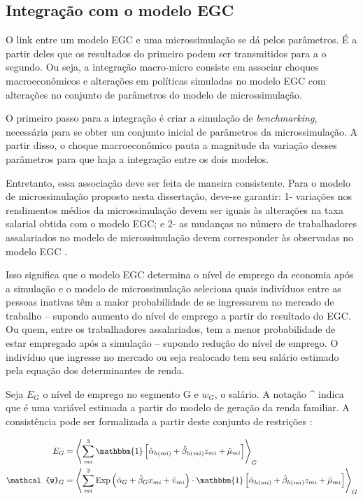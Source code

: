 \subsection{Integração com o modelo EGC}\label{subsec:integracao}

O link entre um modelo EGC e uma microssimulação se dá pelos parâmetros. É a partir deles que os resultados do primeiro podem ser transmitidos para a o segundo. Ou seja, a integração macro-micro consiste em associar choques macroeconômicos e alterações em políticas simuladas no modelo EGC com alterações no conjunto de parâmetros do modelo de microssimulação.

O primeiro passo para a integração é criar a simulação de \textit{benchmarking}, necessária para se obter um conjunto inicial de parâmetros da microssimulação. A partir disso, o choque macroeconômico pauta a magnitude da variação desses parâmetros para que haja a integração entre os dois modelos.

Entretanto, essa associação deve ser feita de maneira consistente. Para o modelo de microssimulação proposto nesta dissertação, deve-se garantir: 1- variações nos rendimentos médios da microssimulação devem ser iguais às alterações na taxa salarial obtida com o modelo EGC; e 2- as mudanças no número de trabalhadores assalariados no modelo de microssimulação devem corresponder às observadas no modelo EGC \cite{bourguignon05, colombo08}.

Isso significa que o modelo EGC determina o nível de emprego da economia após a simulação e o modelo de microssimulação seleciona quais indivíduos entre as pessoas inativas têm a maior probabilidade de se ingressarem no mercado de trabalho -- supondo aumento do nível de emprego a partir do resultado do EGC. Ou quem, entre os trabalhadores assalariados, tem a menor probabilidade de estar empregado após a simulação -- supondo redução do nível de emprego. O indivíduo que ingresse no mercado ou seja realocado tem seu salário estimado pela equação dos determinantes de renda. 

Seja $E_G$ o nível de emprego no segmento G e $w_G$, o salário. A notação \^{} indica que é uma variável estimada a partir do modelo de geração da renda familiar. A consistência pode ser formalizada a partir deste conjunto de restrições \cite{bourguignon05}:

\begin{align}
	E_G &= \left\langle \sum_{mi}^{3} \mathbbm{1} \left[ \hat{\alpha}_{h(mi)} + \hat{\beta}_{h(mi)} z_{mi} + \hat{\mu}_{mi} \right] \right\rangle_{G} \label{eq:emprego_ag} \\
	\mathcal{w}_G &= \left\langle \sum_{mi}^{3} \text{Exp} \left( \hat{\alpha}_G + \hat{\beta}_G x_{mi} + \hat{\upsilon}_{mi} \right) \cdot \mathbbm{1} \left[ \hat{\alpha}_{h(mi)} + \hat{\beta}_{h(mi)} z_{mi} + \hat{\mu}_{mi} \right] \right\rangle_{G} \label{eq:renda_ag}
\end{align}

